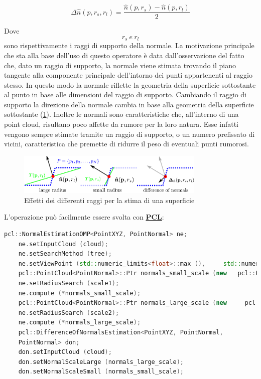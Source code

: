 \begin{equation}
    \Delta\hat{n}(p,r_s,r_l) = \frac{\hat{n}(p,r_s)-\hat{n}(p,r_l)}{2}
    \label{eq:DoNOperator}
\end{equation}

Dove $$r_s \:e\: r_l$$ sono rispettivamente i raggi di supporto della normale. \newline
La motivazione principale che sta alla base dell'uso di questo operatore è data dall'osservazione del fatto che, dato un raggio di supporto, la normale viene stimata trovando il piano tangente alla componente principale dell'intorno dei punti appartenenti al raggio stesso. \newline
In questo modo la normale riflette la geometria della superficie sottostante al punto in base alle dimensioni del raggio di supporto. Cambiando il raggio di supporto la direzione della normale cambia in base alla geometria della superficie sottostante (\ref{fig:DoNsurface}).
\newline
Inoltre le normali sono caratteristiche che, all'interno di una point cloud, risultano poco affette da rumore per la loro natura. 
Esse infatti vengono sempre stimate tramite un raggio di supporto, o un numero prefissato di vicini, caratteristica che premette di ridurre il peso di eventuali punti rumorosi.

\begin{figure}[h!]
    \centering
    \includegraphics[width=0.8\textwidth]{Immagini/don_scalenormals.pdf}
    \caption{Effetti dei differenti raggi per la stima di una superficie}
    \label{fig:DoNsurface}
\end{figure}

L'operazione può facilmente essere svolta con \hyperref[sez:PCL]{\textbf{PCL}}:

\begin{lstlisting}[caption={Applicazione della DoN},captionpos=b,language=cpp]
    pcl::NormalEstimationOMP<PointXYZ, PointNormal> ne;
    ne.setInputCloud (cloud);
    ne.setSearchMethod (tree);
    ne.setViewPoint (std::numeric_limits<float>::max (),     std::numeric_limits<float>::max (), std::numeric_limits<float>::max ());
    pcl::PointCloud<PointNormal>::Ptr normals_small_scale (new   pcl::PointCloud<PointNormal>);
    ne.setRadiusSearch (scale1);
    ne.compute (*normals_small_scale);
    pcl::PointCloud<PointNormal>::Ptr normals_large_scale (new     pcl::PointCloud<PointNormal>);
    ne.setRadiusSearch (scale2);
    ne.compute (*normals_large_scale);
    pcl::DifferenceOfNormalsEstimation<PointXYZ, PointNormal, 
    PointNormal> don;
    don.setInputCloud (cloud);
    don.setNormalScaleLarge (normals_large_scale);
    don.setNormalScaleSmall (normals_small_scale);
\end{lstlisting}
\vspace{1cm} 

